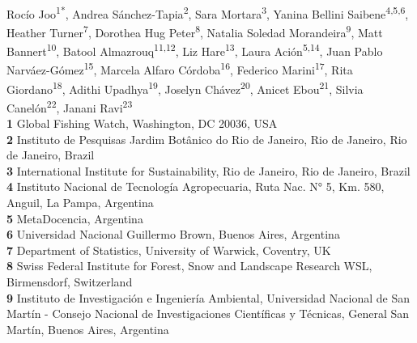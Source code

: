 \documentclass[10pt,letterpaper]{article}
\begin{document}
\vspace*{0.2in}

\begin{flushleft}
{\Large
\textbf{} %
}
\newline
\\
Rocío Joo\textsuperscript{1*\Yinyang}, 
Andrea Sánchez-Tapia\textsuperscript{2\Yinyang},
Sara Mortara\textsuperscript{3},
Yanina Bellini Saibene\textsuperscript{4,5,6},
Heather Turner\textsuperscript{7}, %
Dorothea Hug Peter\textsuperscript{8}, %
Natalia Soledad Morandeira\textsuperscript{9},
Matt Bannert\textsuperscript{10},
Batool Almazrouq\textsuperscript{11,12},
Liz Hare\textsuperscript{13},
Laura Ación\textsuperscript{5,14},
Juan Pablo Narváez-Gómez\textsuperscript{15},
Marcela Alfaro Córdoba\textsuperscript{16},
Federico Marini\textsuperscript{17},
Rita Giordano\textsuperscript{18},
Adithi Upadhya\textsuperscript{19},
Joselyn Chávez\textsuperscript{20},
Anicet Ebou\textsuperscript{21},
Silvia Canelón\textsuperscript{22},
Janani Ravi\textsuperscript{23}
\\
\bigskip
\textbf{1} Global Fishing Watch, Washington, DC 20036, USA
\\
\textbf{2} Instituto de Pesquisas Jardim Botânico do Rio de Janeiro, Rio de Janeiro, Rio de Janeiro, Brazil
\\
\textbf{3} International Institute for Sustainability, Rio de Janeiro, Rio de Janeiro, Brazil
\\
\textbf{4} Instituto Nacional de Tecnología Agropecuaria, Ruta Nac. N° 5, Km. 580, Anguil, La Pampa, Argentina
\\
\textbf{5} MetaDocencia, Argentina
\\
\textbf{6} Universidad Nacional Guillermo Brown, Buenos Aires, Argentina
\\
\textbf{7} Department of Statistics, University of Warwick, Coventry, UK
\\
\textbf{8} Swiss Federal Institute for Forest, Snow and Landscape Research WSL, Birmensdorf, Switzerland
\\
\textbf{9} Instituto de Investigación e Ingeniería Ambiental, Universidad Nacional de San Martín - Consejo Nacional de Investigaciones Científicas y Técnicas, General San Martín, Buenos Aires, Argentina

\end{flushleft}
\end{document}
